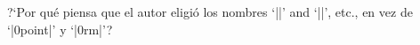 


\bigskip

\enunciadoS ?`Por qu\'e piensa que el autor eligi\'o los nombres
`|\tenpoint|' and `|\tenrm|', etc., en vez de `|\10point|' y
`|\10rm|'?

\bigskip


\bye